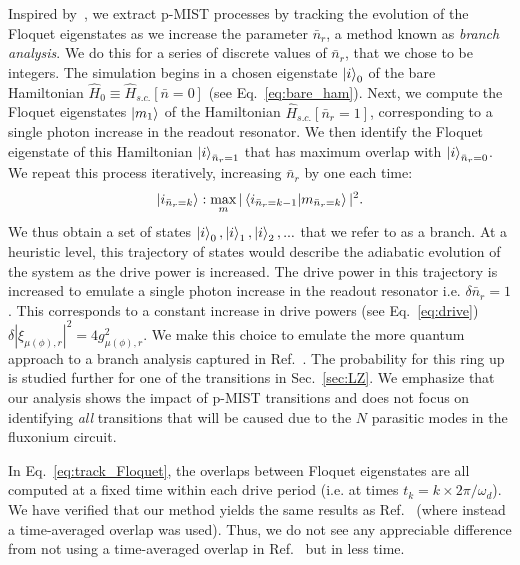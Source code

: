 \documentclass[%
reprint,
superscriptaddress,
 amsmath,amssymb,
 aps,
 prx,
longbibliography,
floatfix,
]{revtex4-2}
\begin{document}
Inspired by~\cite{dumas2024unified,cohen2023reminiscence}, we extract p-MIST processes by tracking the evolution of  the Floquet eigenstates as we increase the parameter $\bar{n}_r$, a method known as \emph{branch analysis}. 
We do this for a series of discrete values of $\bar{n}_r$, that we chose to be integers.  The simulation begins in a chosen eigenstate $\ket{i}_0$ of the bare Hamiltonian $\hat{H}_0 \equiv \hat{H}_{s.c.}[\bar{n}=0]$ (see Eq.~\ref{eq:bare_ham}). 
Next, we compute the Floquet eigenstates $\ket{m_1}$ of the Hamiltonian $\hat{H}_{s.c.}[\bar{n}_r=1]$,
corresponding to a single photon increase in the readout resonator. We then identify the Floquet eigenstate of this Hamiltonian $\ket{i}_{\bar n_r=1}$ that has maximum overlap with $\ket{i}_{\bar n_r=0}$.  We repeat this process iteratively, increasing $\bar{n}_r$ by one each time:
\begin{align}
\ket{i_{\bar n_r=k}}:\max_{m}|\braket{i_{\bar n_r=k-1}|{m}_{\bar n_r=k}}|^2.\label{eq:track_Floquet}   
\end{align}
We thus obtain a set of states $\ket{i}_0,\ket{i}_1,\ket{i}_2,...$ that we refer to as a branch.  At a heuristic level, this trajectory of states would describe the adiabatic evolution of the system as the drive power is increased. The drive power in this trajectory is increased to emulate a single photon increase in the readout resonator i.e. $\delta \bar n_r=1$. This corresponds to a constant increase in drive powers (see Eq.~\ref{eq:drive}) $\delta |\xi_{\mu (\phi),r}|^2=4g_{\mu (\phi),r}^2$. We make this choice to emulate the more quantum approach to a branch analysis captured in Ref.~\cite{shillito2022dynamics,dumas2024unified}. The probability for this ring up is studied further for one of the transitions in Sec.~\ref{sec:LZ}. We emphasize that our analysis shows the impact of p-MIST transitions and does not focus on identifying \emph{all} transitions that will be caused due to the $N$ parasitic modes in the fluxonium circuit.


In Eq.~\ref{eq:track_Floquet}, the overlaps between Floquet eigenstates are all computed at a fixed time within each drive period (i.e. at times $t_k = k \times 2 \pi / \omega_d$).  We have verified that our method yields the same results as Ref.~\cite{dumas2024unified} (where instead a time-averaged overlap was used). Thus, we do not see any appreciable difference from not using a time-averaged overlap in Ref.~\cite{dumas2024unified} but in less time.
\end{document}
